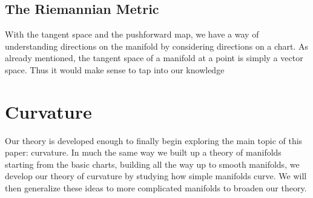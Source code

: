 \documentclass[]{article}
\newcommand\<{\ensuremath{\left\langle}}
\renewcommand\>{\ensuremath{\right\rangle}}
\theoremstyle{definition}
\theoremstyle{definition}
\begin{document}
	\subsection*{The Riemannian Metric}
	With the tangent space and the pushforward map, we have a way of understanding directions on the manifold by considering directions on a chart. As already mentioned, the tangent space of a manifold at a point is simply a vector space. Thus it would make sense to tap into our knowledge 
	
	
	
	\newpage
	\section{Curvature}
	Our theory is developed enough to finally begin exploring the main topic of this paper: curvature. In much the same way we built up a theory of manifolds starting from the basic charts, building all the way up to smooth manifolds, we develop our theory of curvature by studying how simple manifolds curve. We will then generalize these ideas to more complicated manifolds to broaden our theory. 
	
\end{document}
